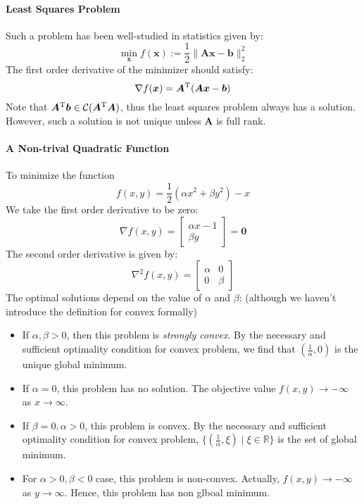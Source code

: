 \paragraph{Least Squares Problem} Such a problem has been well-studied in statistics given by:
\[
\min_{\bm x}f(\bm x):=\frac{1}{2}\|\bm{Ax}-\bm b\|_2^2
\]
The first order derivative of the minimizer should satisfy:
\[
\nabla f(\bm x)=\bm A^{\mathrm T}(\bm A\bm x-\bm b)
\]
Note that $\bm A^{\mathrm T}\bm b\in\mathcal{C}(\bm A^{\mathrm T}\bm A)$, thus the least squares problem always has a solution. However, such a solution is not unique unless $\bm A$ is full rank.
\paragraph{A Non-trival Quadratic Function}
To minimize the function
\[
f(x,y)=\frac{1}{2}(\alpha x^2+\beta y^2)-x
\] 
We take the first order derivative to be zero:
\[
\nabla f(x,y)=\begin{bmatrix}
\alpha x-1\\\beta y
\end{bmatrix}=\bm0
\]
The second order derivative is given by:
\[
\nabla^2 f(x,y)=\begin{bmatrix}
\alpha&0\\0&\beta
\end{bmatrix}
\]
The optimal solutions depend on the value of $\alpha$ and $\beta$: (although we haven't introduce the definition for convex formally)
\begin{itemize}
\item
If $\alpha,\beta>0$, then this problem is \emph{strongly convex}. By the necessary and sufficient optimality condition for convex problem, we find that $(\frac{1}{\alpha},0)$ is the unique global minimum.
\item
If $\alpha=0$, this problem has no solution. The objective value $f(x,y)\to-\infty$ as $x\to
\infty$.
\item
If $\beta=0,\alpha>0$, this problem is convex.  By the necessary and sufficient optimality condition for convex problem, $\{(\frac{1}{\alpha},\xi)\mid \xi\in\mathbb{R}\}$ is the set of global minimum.
\item
For $\alpha>0,\beta<0$ case, this problem is non-convex. Actually, $f(x,y)\to-\infty$ as $y\to
\infty$. Hence, this problem has non glboal minimum.
\end{itemize}

